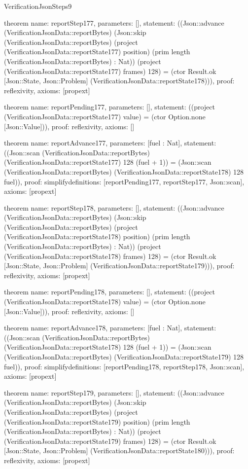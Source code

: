 \begin{lexlean}{VerificationJsonSteps9}
\begin{semanticmodule}
theorem{
  name: reportStep177,
  parameters: [],
  statement: ((Json::advance (VerificationJsonData::reportBytes) (Json::skip (VerificationJsonData::reportBytes) (project (VerificationJsonData::reportState177) position) (prim length (VerificationJsonData::reportBytes) : Nat)) (project (VerificationJsonData::reportState177) frames) 128) = (ctor Result.ok [Json::State, Json::Problem] (VerificationJsonData::reportState178))),
  proof: reflexivity{},
  axioms: [propext]
}

theorem{
  name: reportPending177,
  parameters: [],
  statement: ((project (VerificationJsonData::reportState177) value) = (ctor Option.none [Json::Value])),
  proof: reflexivity{},
  axioms: []
}

theorem{
  name: reportAdvance177,
  parameters: [fuel : Nat],
  statement: ((Json::scan (VerificationJsonData::reportBytes) (VerificationJsonData::reportState177) 128 (fuel + 1)) = (Json::scan (VerificationJsonData::reportBytes) (VerificationJsonData::reportState178) 128 fuel)),
  proof: simplify{definitions: [reportPending177, reportStep177, Json::scan]},
  axioms: [propext]
}

theorem{
  name: reportStep178,
  parameters: [],
  statement: ((Json::advance (VerificationJsonData::reportBytes) (Json::skip (VerificationJsonData::reportBytes) (project (VerificationJsonData::reportState178) position) (prim length (VerificationJsonData::reportBytes) : Nat)) (project (VerificationJsonData::reportState178) frames) 128) = (ctor Result.ok [Json::State, Json::Problem] (VerificationJsonData::reportState179))),
  proof: reflexivity{},
  axioms: [propext]
}

theorem{
  name: reportPending178,
  parameters: [],
  statement: ((project (VerificationJsonData::reportState178) value) = (ctor Option.none [Json::Value])),
  proof: reflexivity{},
  axioms: []
}

theorem{
  name: reportAdvance178,
  parameters: [fuel : Nat],
  statement: ((Json::scan (VerificationJsonData::reportBytes) (VerificationJsonData::reportState178) 128 (fuel + 1)) = (Json::scan (VerificationJsonData::reportBytes) (VerificationJsonData::reportState179) 128 fuel)),
  proof: simplify{definitions: [reportPending178, reportStep178, Json::scan]},
  axioms: [propext]
}

theorem{
  name: reportStep179,
  parameters: [],
  statement: ((Json::advance (VerificationJsonData::reportBytes) (Json::skip (VerificationJsonData::reportBytes) (project (VerificationJsonData::reportState179) position) (prim length (VerificationJsonData::reportBytes) : Nat)) (project (VerificationJsonData::reportState179) frames) 128) = (ctor Result.ok [Json::State, Json::Problem] (VerificationJsonData::reportState180))),
  proof: reflexivity{},
  axioms: [propext]
}


\end{semanticmodule}
\end{lexlean}
